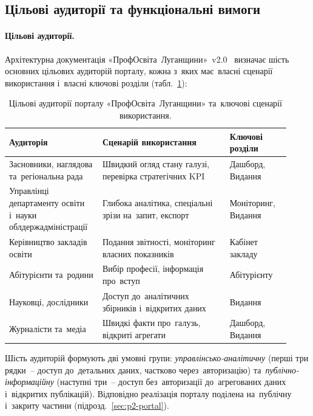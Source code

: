 \subsection{Цільові аудиторії та функціональні вимоги}
\label{sec:p2-requirements}

\paragraph*{\textbf{Цільові аудиторії.}}
\label{sec:p2-req-audiences}

Архітектурна документація «ПрофОсвіта~Луганщини»~v2.0~\cite{NMTsPTO2025} визначає шість основних цільових аудиторій порталу, кожна з~яких має~власні сценарії використання і~власні ключові розділи (табл.~\ref{tab:audiences}):

\begin{table}[htbp]
\centering
\caption{Цільові аудиторії порталу «ПрофОсвіта~Луганщини» та~ключові сценарії використання.}
\label{tab:audiences}
\small
\setlength\tabcolsep{4pt}
\renewcommand{\arraystretch}{1.15}
\begin{tabular}{|p{0.30\linewidth}|p{0.42\linewidth}|p{0.20\linewidth}|}
\hline
\textbf{Аудиторія} & \textbf{Сценарій використання} & \textbf{Ключові розділи} \\
\hline
Засновники, наглядова та~регіональна рада & Швидкий огляд стану галузі, перевірка стратегічних KPI & Дашборд, Видання \\
\hline
Управлінці департаменту освіти і~науки облдержадміністрації & Глибока аналітика, спеціальні зрізи на~запит, експорт & Моніторинг, Видання \\
\hline
Керівництво закладів освіти & Подання звітності, моніторинг власних показників & Кабінет закладу \\
\hline
Абітурієнти та~родини & Вибір професії, інформація про~вступ & Абітурієнту \\
\hline
Науковці, дослідники & Доступ до~аналітичних збірників і~відкритих даних & Видання \\
\hline
Журналісти та~медіа & Швидкі факти про~галузь, відкриті агрегати & Дашборд, Видання \\
\hline
\end{tabular}
\end{table}

Шість аудиторій формують дві умовні групи: \emph{управлінсько-аналітичну} (перші три рядки~-- доступ до~детальних даних, частково через~авторизацію) та~\emph{публічно-інформаційну} (наступні три~-- доступ без~авторизації до~агрегованих даних і~відкритих публікацій). Відповідно реалізація порталу поділена на~публічну і~закриту частини (підрозд.~\ref{sec:p2-portal}).

